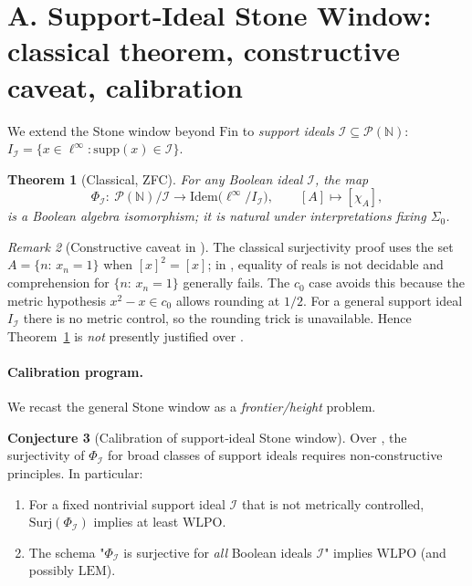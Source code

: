 \documentclass[11pt]{article}
\newtheorem{theorem}{Theorem}[section]
\theoremstyle{definition}
\newtheorem{conjecture}[theorem]{Conjecture}
\theoremstyle{remark}
\newtheorem{remark}[theorem]{Remark}
\newcommand{\linf}{\ell^\infty}
\newcommand{\WLPO}{\mathrm{WLPO}}
\newcommand{\LEM}{\mathrm{LEM}}
\newcommand{\BISH}{\mathrm{BISH}}
\newcommand{\SigmaZero}{\Sigma_{0}}
\begin{document}
\section{A. Support‑Ideal Stone Window: classical theorem, constructive caveat, calibration}

We extend the Stone window beyond $\mathrm{Fin}$ to \emph{support ideals} $\mathcal I\subseteq\mathcal P(\mathbb N)$:
$I_{\mathcal I}=\{x\in\linf:\mathrm{supp}(x)\in\mathcal I\}$.

\begin{theorem}[Classical, ZFC]\label{VI:thm:stone-general-classical}
For any Boolean ideal $\mathcal I$, the map
\[
\Phi_{\mathcal I}: \ \mathcal P(\mathbb N)/\mathcal I \longrightarrow \mathrm{Idem}\big(\linf/I_{\mathcal I}\big),\qquad [A]\mapsto [\chi_A],
\]
is a Boolean algebra isomorphism; it is natural under interpretations fixing $\SigmaZero$.
\end{theorem}

\begin{remark}[Constructive caveat in \BISH]\label{VI:rem:constructive-caveat}
The classical surjectivity proof uses the set $A=\{n:\, x_n=1\}$ when $[x]^2=[x]$; in \BISH, equality of reals is not decidable and comprehension for $\{n:\,x_n=1\}$ generally fails. The $c_0$ case avoids this because the metric hypothesis $x^2-x\in c_0$ allows rounding at $1/2$. For a general support ideal $I_{\mathcal I}$ there is no metric control, so the rounding trick is unavailable. Hence Theorem~\ref{VI:thm:stone-general-classical} is \emph{not} presently justified over \BISH.
\end{remark}

\paragraph{Calibration program.}
We recast the general Stone window as a \emph{frontier/height} problem.

\begin{conjecture}[Calibration of support‑ideal Stone window]\label{VI:conj:stone-calibration}
Over \BISH, the surjectivity of $\Phi_{\mathcal I}$ for broad classes of support ideals requires non‑constructive principles. In particular:
\begin{enumerate}
\item For a fixed nontrivial support ideal $\mathcal I$ that is not metrically controlled, \(\mathrm{Surj}(\Phi_{\mathcal I})\) implies at least \(\WLPO\).
\item The schema "$\Phi_{\mathcal I}$ is surjective for \emph{all} Boolean ideals $\mathcal I$" implies \(\WLPO\) (and possibly \(\LEM\)).
\end{enumerate}
\end{conjecture}
\end{document}

